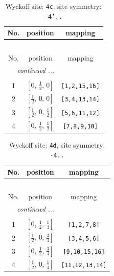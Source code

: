 \documentclass[fleqn,8pt]{jsarticle}
\begin{document}
\renewcommand{\arraystretch}{1.2}
\begin{longtable}{ccc}
\caption{Wyckoff site: {\tt 4c}, site symmetry: {\tt -4'..}}
 \\
 \hline \hline
No. & position & mapping \\ \hline \endfirsthead

\multicolumn{2}{l}{\tablename\ \thetable{}} \\
 \hline \hline
No. & position & mapping \\ \hline \endhead

 \hline \hline
\multicolumn{2}{r}{\footnotesize\it continued ...} \\ \endfoot

 \hline \hline
\multicolumn{2}{r}{} \\ \endlastfoot

1 & $\left[ 0,\, \frac{1}{2},\, 0 \right]$ & {\tt [1,2,15,16]} \\ \hline
2 & $\left[ \frac{1}{2},\, 0,\, 0 \right]$ & {\tt [3,4,13,14]} \\ \hline
3 & $\left[ \frac{1}{2},\, 0,\, \frac{1}{2} \right]$ & {\tt [5,6,11,12]} \\ \hline
4 & $\left[ 0,\, \frac{1}{2},\, \frac{1}{2} \right]$ & {\tt [7,8,9,10]} \\
\end{longtable}
\renewcommand{\arraystretch}{1.2}
\begin{longtable}{ccc}
\caption{Wyckoff site: {\tt 4d}, site symmetry: {\tt -4..}}
 \\
 \hline \hline
No. & position & mapping \\ \hline \endfirsthead

\multicolumn{2}{l}{\tablename\ \thetable{}} \\
 \hline \hline
No. & position & mapping \\ \hline \endhead

 \hline \hline
\multicolumn{2}{r}{\footnotesize\it continued ...} \\ \endfoot

 \hline \hline
\multicolumn{2}{r}{} \\ \endlastfoot

1 & $\left[ 0,\, \frac{1}{2},\, \frac{1}{4} \right]$ & {\tt [1,2,7,8]} \\ \hline
2 & $\left[ \frac{1}{2},\, 0,\, \frac{3}{4} \right]$ & {\tt [3,4,5,6]} \\ \hline
3 & $\left[ 0,\, \frac{1}{2},\, \frac{3}{4} \right]$ & {\tt [9,10,15,16]} \\ \hline
4 & $\left[ \frac{1}{2},\, 0,\, \frac{1}{4} \right]$ & {\tt [11,12,13,14]} \\
\end{longtable}
\end{document}
